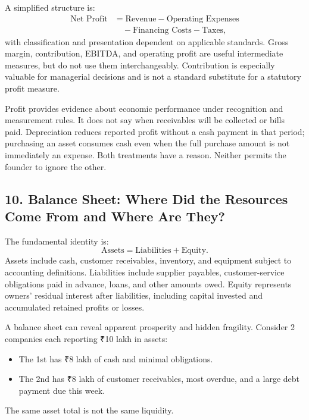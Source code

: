 A simplified structure is:
\begin{equation}
\begin{aligned}
\text{Net Profit} &= \text{Revenue} - \text{Operating Expenses} \\
&\quad - \text{Financing Costs} - \text{Taxes},
\end{aligned}
\end{equation}
with classification and presentation dependent on applicable standards. Gross margin, contribution, EBITDA, and operating profit are useful intermediate measures, but do not use them interchangeably. Contribution is especially valuable for managerial decisions and is not a standard substitute for a statutory profit measure.

Profit provides evidence about economic performance under recognition and measurement rules. It does not say when receivables will be collected or bills paid. Depreciation reduces reported profit without a cash payment in that period; purchasing an asset consumes cash even when the full purchase amount is not immediately an expense. Both treatments have a reason. Neither permits the founder to ignore the other.

\subsection*{10. Balance Sheet: Where Did the Resources Come From and Where Are They?}

The fundamental identity is:
\begin{equation}
\boxed{\text{Assets} = \text{Liabilities} + \text{Equity}}.
\end{equation}
Assets include cash, customer receivables, inventory, and equipment subject to accounting definitions. Liabilities include supplier payables, customer-service obligations paid in advance, loans, and other amounts owed. Equity represents owners' residual interest after liabilities, including capital invested and accumulated retained profits or losses.

A balance sheet can reveal apparent prosperity and hidden fragility. Consider 2 companies each reporting ₹10 lakh in assets:
\begin{itemize}
\item The 1st has ₹8 lakh of cash and minimal obligations.
\item The 2nd has ₹8 lakh of customer receivables, most overdue, and a large debt payment due this week.
\end{itemize}
The same asset total is not the same liquidity.

